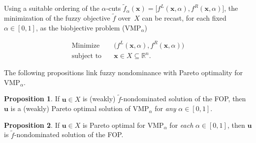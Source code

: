 \documentclass{article}
\theoremstyle{definition}
\newtheorem{maar}{Definition}[section]
\newtheorem{prop}[maar]{Proposition}
\begin{document}
Using a suitable ordering of the $\alpha$‑cuts
$\widetilde f_{\alpha}(\boldsymbol x)=\bigl[f^{L}(\boldsymbol x,\alpha),
f^{R}(\boldsymbol x,\alpha)\bigr]$, the minimization of the fuzzy objective $\tilde f$
over~$X$ can be recast, for each fixed $\alpha\in[0,1]$, as the biobjective
problem (VMP\(_{\alpha}\))

\[
\begin{aligned}
  \text{Minimize} \quad & \bigl(f^{L}(\boldsymbol x,\alpha),
                                 f^{R}(\boldsymbol x,\alpha)\bigr)\\
  \text{subject to} \quad & \boldsymbol x \in X \subseteq \mathbb R^n.
\end{aligned}
\]




The following propositions link fuzzy nondominance with Pareto optimality for \(\text{VMP}_{\alpha}\).
\begin{prop}\cite{Ant}\label{prop:weakFtoWeakPareto}
If $\boldsymbol u\in X$ is (weakly) \(\tilde f\)-nondominated solution of the FOP, then $\boldsymbol u$ is a (weakly) Pareto optimal
solution of \(\text{VMP}_{\alpha}\) for \emph{any} $\alpha\in[0,1]$.
\end{prop}

\begin{prop}\cite{Ant}\label{prop:ParetoFamilyToF}
If $\boldsymbol u\in X$ is Pareto optimal for \(\text{VMP}_{\alpha}\) for
\emph{each} $\alpha\in [0,1]$, then $\boldsymbol u$ is \(\tilde f\)-nondominated solution of the FOP.
\end{prop}
\end{document}
